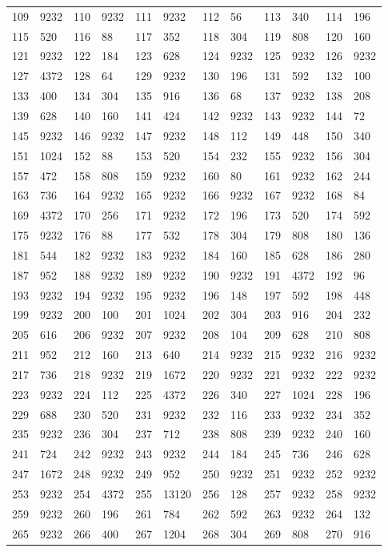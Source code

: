 \begin{longtable}{llllllllllll}
109 & 9232&110 &9232&111& 9232&112 &56&113 &340&114& 196\\
115 & 520&116 &88&117& 352&118 &304&119 &808&120& 160\\
121 & 9232&122 &184&123& 628&124 &9232&125 &9232&126& 9232\\
127 & 4372&128 &64&129& 9232&130 &196&131 &592&132& 100\\
133 & 400&134 &304&135& 916&136 &68&137 &9232&138& 208\\
139 & 628&140 &160&141& 424&142 &9232&143 &9232&144& 72\\
145 & 9232&146 &9232&147& 9232&148 &112&149 &448&150& 340\\
151 & 1024&152 &88&153& 520&154 &232&155 &9232&156& 304\\
157 & 472&158 &808&159& 9232&160 &80&161 &9232&162& 244\\
163 & 736&164 &9232&165& 9232&166 &9232&167 &9232&168& 84\\
169 & 4372&170 &256&171& 9232&172 &196&173 &520&174& 592\\
175 & 9232&176 &88&177& 532&178 &304&179 &808&180& 136\\
181 & 544&182 &9232&183& 9232&184 &160&185 &628&186& 280\\
187 & 952&188 &9232&189& 9232&190 &9232&191 &4372&192& 96\\
193 & 9232&194 &9232&195& 9232&196 &148&197 &592&198& 448\\
199 & 9232&200 &100&201& 1024&202 &304&203 &916&204& 232\\
205 & 616&206 &9232&207& 9232&208 &104&209 &628&210& 808\\
211 & 952&212 &160&213& 640&214 &9232&215 &9232&216& 9232\\
217 & 736&218 &9232&219& 1672&220 &9232&221 &9232&222& 9232\\
223 & 9232&224 &112&225& 4372&226 &340&227 &1024&228& 196\\
229 & 688&230 &520&231& 9232&232 &116&233 &9232&234& 352\\
235 & 9232&236 &304&237& 712&238 &808&239 &9232&240& 160\\
241 & 724&242 &9232&243& 9232&244 &184&245 &736&246& 628\\
247 & 1672&248 &9232&249& 952&250 &9232&251 &9232&252& 9232\\
253 & 9232&254 &4372&255& 13120&256 &128&257 &9232&258& 9232\\
259 & 9232&260 &196&261& 784&262 &592&263 &9232&264& 132\\
265 & 9232&266 &400&267& 1204&268 &304&269 &808&270& 916\\

\end{longtable}
